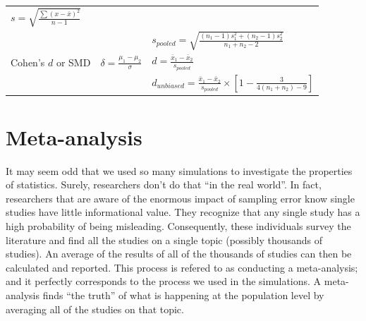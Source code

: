 \documentclass[
]{krantz}
\begin{document}
\begin{longtable}[]{@{}lll@{}}
\begin{minipage}[t]{0.30\columnwidth}
\(s =\sqrt{\frac{\sum{(x - \bar{x})^2}}{n-1}}\)\strut
\end{minipage}\tabularnewline
\begin{minipage}[t]{0.30\columnwidth}\raggedright
\strut
\end{minipage} & \begin{minipage}[t]{0.30\columnwidth}\raggedright
\strut
\end{minipage} & \begin{minipage}[t]{0.30\columnwidth}\raggedright
\(s_{pooled} = \sqrt{\frac{(n_1 -1)s_1^2 + (n_2 -1)s_2^2}{n_1 + n_2-2}}\)\strut
\end{minipage}\tabularnewline
\begin{minipage}[t]{0.30\columnwidth}\raggedright
Cohen's \(d\) or SMD\strut
\end{minipage} & \begin{minipage}[t]{0.30\columnwidth}\raggedright
\(\delta= \frac{\mu_{1} - \mu_{2}}{\sigma}\)\strut
\end{minipage} & \begin{minipage}[t]{0.30\columnwidth}\raggedright
\(d = \frac{\bar{x}_{1} - \bar{x}_{2}}{s_{pooled}}\)\strut
\end{minipage}\tabularnewline
\begin{minipage}[t]{0.30\columnwidth}\raggedright
\strut
\end{minipage} & \begin{minipage}[t]{0.30\columnwidth}\raggedright
\strut
\end{minipage} & \begin{minipage}[t]{0.30\columnwidth}\raggedright
\(d_{unbiased} = \frac{\bar{x}_{1} - \bar{x}_{2}}{s_{pooled}} \times [1 - \frac{3}{4(n_1 + n_2)-9}]\)\strut
\end{minipage}\tabularnewline
\bottomrule
\end{longtable}

\singlespacing

\hypertarget{meta-analysis}{%
\section{Meta-analysis}\label{meta-analysis}}

It may seem odd that we used so many simulations to investigate the properties of statistics. Surely, researchers don't do that ``in the real world''. In fact, researchers that are aware of the enormous impact of sampling error know single studies have little informational value. They recognize that any single study has a high probability of being misleading. Consequently, these individuals survey the literature and find all the studies on a single topic (possibly thousands of studies). An average of the results of all of the thousands of studies can then be calculated and reported. This process is refered to as conducting a meta-analysis; and it perfectly corresponds to the process we used in the simulations. A meta-analysis finds ``the truth'' of what is happening at the population level by averaging all of the studies on that topic.
\end{document}
